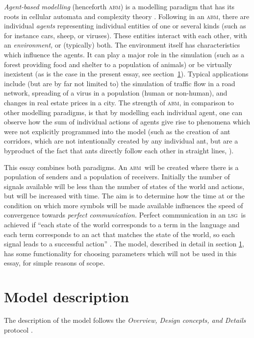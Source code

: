 \documentclass[DIV=calc,BCOR=0mm,pagesize]{scrartcl}
\newcommand{\abm}{\textsc{abm}}
\newcommand{\lsg}{\textsc{lsg}}
\newcommand{\odd}{\textsc{odd}}
\begin{document}
\emph{Agent-based modelling} (henceforth \abm) is a modelling paradigm that has its roots in cellular automata and complexity theory \citep{heath_some_2014}.
Following \citet{grimm_individual_2005,railsback_agent_2011} in an \abm, there are individual \emph{agents} representing individual entities of one or several kinds (such as for instance cars, sheep, or viruses).
These entities interact with each other, with an \emph{environment,} or (typically) both.
The environment itself has characteristics which influence the agents.
It can play a major role in the simulation (such as a forest providing food and shelter to a population of animals) or be virtually inexistent (as is the case in the present essay, see section~\ref{sec:mod}).
Typical applications include (but are by far not limited to) the simulation of traffic flow in a road network, spreading of a virus in a population (human or non-human), and changes in real estate prices in a city.
The strength of \abm, in comparison to other modelling paradigms, is that  by modelling each individual agent, one can observe how the sum of individual actions of agents give rise to phenomena which were not explicitly programmed into the model (such as the creation of ant corridors, which are not intentionally created by any individual ant, but are a byproduct of the fact that ants directly follow each other in straight lines, \citet{wilensky_netlogo_1997}).

This essay combines both paradigms.
An \abm\ will be created where there is a population of senders and a population of receivers.
Initially the number of signals available will be less than the number of states of the world and actions, but will be increased with time.
The aim is to determine how the time at or the condition on which more symbols will be made available influences the speed of convergence towards \emph{perfect communication.}
Perfect communication in an \lsg\ is achieved if ``each state of the world corresponds to a term in the language and each term corresponds to an act that matches the state of the world, so each signal leads to a successful action'' \citep[p.~530, there referred to as ``perfect Lewis signalling system'']{barrett_dynamic_2007}.
The model, described in detail in section \ref{sec:mod}, has some functionality for choosing parameters which will not be used in this essay, for simple reasons of scope.


\section{Model description}
\label{sec:mod}
The description of the model follows the \emph{Overview, Design concepts, and Details} protocol \citep[][henceforth \odd]{grimm_standard_2006, grimm_odd_2010}.
\end{document}
